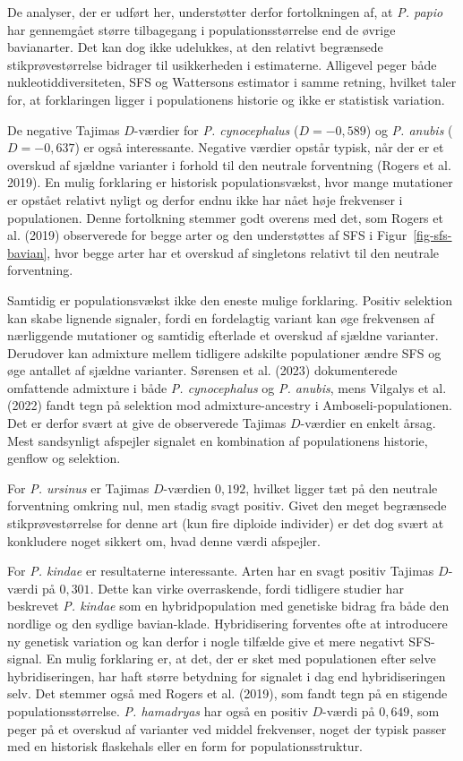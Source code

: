 \documentclass[
  10pt,
  a4paper,
]{scrbook}
\let\oldemph\emph
\renewcommand\emph[1]{\oldemph{\color{gray}#1}}
\begin{document}
De analyser, der er udført her, understøtter derfor fortolkningen af, at
\emph{P. papio} har gennemgået større tilbagegang i populationsstørrelse
end de øvrige bavianarter. Det kan dog ikke udelukkes, at den relativt
begrænsede stikprøvestørrelse bidrager til usikkerheden i estimaterne.
Alligevel peger både nukleotiddiversiteten, SFS og Wattersons estimator
i samme retning, hvilket taler for, at forklaringen ligger i
populationens historie og ikke er statistisk variation.

De negative Tajimas \(D\)-værdier for \emph{P. cynocephalus}
(\(D = -0{,}589\)) og \emph{P. anubis} (\(D = -0{,}637\)) er også
interessante. Negative værdier opstår typisk, når der er et overskud af
sjældne varianter i forhold til den neutrale forventning ({Rogers et
al.} 2019). En mulig forklaring er historisk populationsvækst, hvor
mange mutationer er opstået relativt nyligt og derfor endnu ikke har
nået høje frekvenser i populationen. Denne fortolkning stemmer godt
overens med det, som {Rogers et al.} (2019) observerede for begge arter
og den understøttes af SFS i Figur~\ref{fig-sfs-bavian}, hvor begge
arter har et overskud af singletons relativt til den neutrale
forventning.

Samtidig er populationsvækst ikke den eneste mulige forklaring. Positiv
selektion kan skabe lignende signaler, fordi en fordelagtig variant kan
øge frekvensen af nærliggende mutationer og samtidig efterlade et
overskud af sjældne varianter. Derudover kan admixture mellem tidligere
adskilte populationer ændre SFS og øge antallet af sjældne varianter.
{Sørensen et al.} (2023) dokumenterede omfattende admixture i både
\emph{P. cynocephalus} og \emph{P. anubis}, mens {Vilgalys et al.}
(2022) fandt tegn på selektion mod admixture-ancestry i
Amboseli-populationen. Det er derfor svært at give de observerede
Tajimas \(D\)-værdier en enkelt årsag. Mest sandsynligt afspejler
signalet en kombination af populationens historie, genflow og selektion.

For \emph{P. ursinus} er Tajimas \(D\)-værdien \(0{,}192\), hvilket
ligger tæt på den neutrale forventning omkring nul, men stadig svagt
positiv. Givet den meget begrænsede stikprøvestørrelse for denne art
(kun fire diploide individer) er det dog svært at konkludere noget
sikkert om, hvad denne værdi afspejler.

For \emph{P. kindae} er resultaterne interessante. Arten har en svagt
positiv Tajimas \(D\)-værdi på \(0{,}301\). Dette kan virke
overraskende, fordi tidligere studier har beskrevet \emph{P. kindae} som
en hybridpopulation med genetiske bidrag fra både den nordlige og den
sydlige bavian-klade. Hybridisering forventes ofte at introducere ny
genetisk variation og kan derfor i nogle tilfælde give et mere negativt
SFS-signal. En mulig forklaring er, at det, der er sket med populationen
efter selve hybridiseringen, har haft større betydning for signalet i
dag end hybridiseringen selv. Det stemmer også med {Rogers et al.}
(2019), som fandt tegn på en stigende populationsstørrelse. \emph{P.
hamadryas} har også en positiv \(D\)-værdi på \(0{,}649\), som peger på
et overskud af varianter ved middel frekvenser, noget der typisk passer
med en historisk flaskehals eller en form for populationsstruktur.
\end{document}

